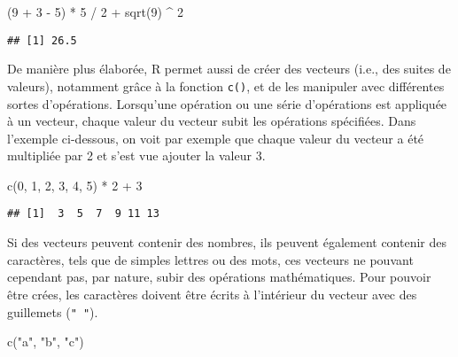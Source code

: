\documentclass[
]{book}
\newenvironment{Shaded}{\begin{snugshade}}{\end{snugshade}}
\newcommand{\DecValTok}[1]{\textcolor[rgb]{0.00,0.00,0.81}{#1}}
\newcommand{\FunctionTok}[1]{\textcolor[rgb]{0.00,0.00,0.00}{#1}}
\newcommand{\NormalTok}[1]{#1}
\newcommand{\SpecialCharTok}[1]{\textcolor[rgb]{0.00,0.00,0.00}{#1}}
\newcommand{\StringTok}[1]{\textcolor[rgb]{0.31,0.60,0.02}{#1}}
\begin{document}
\begin{Shaded}
\begin{Highlighting}[]
\NormalTok{(}\DecValTok{9} \SpecialCharTok{+} \DecValTok{3} \SpecialCharTok{{-}} \DecValTok{5}\NormalTok{) }\SpecialCharTok{*} \DecValTok{5} \SpecialCharTok{/} \DecValTok{2} \SpecialCharTok{+} \FunctionTok{sqrt}\NormalTok{(}\DecValTok{9}\NormalTok{) }\SpecialCharTok{\^{}} \DecValTok{2}
\end{Highlighting}
\end{Shaded}

\begin{verbatim}
## [1] 26.5
\end{verbatim}

De manière plus élaborée, R permet aussi de créer des vecteurs (i.e., des suites de valeurs), notamment grâce à la fonction \texttt{c()}, et de les manipuler avec différentes sortes d'opérations. Lorsqu'une opération ou une série d'opérations est appliquée à un vecteur, chaque valeur du vecteur subit les opérations spécifiées. Dans l'exemple ci-dessous, on voit par exemple que chaque valeur du vecteur a été multipliée par 2 et s'est vue ajouter la valeur 3.

\begin{Shaded}
\begin{Highlighting}[]
\FunctionTok{c}\NormalTok{(}\DecValTok{0}\NormalTok{, }\DecValTok{1}\NormalTok{, }\DecValTok{2}\NormalTok{, }\DecValTok{3}\NormalTok{, }\DecValTok{4}\NormalTok{, }\DecValTok{5}\NormalTok{) }\SpecialCharTok{*} \DecValTok{2} \SpecialCharTok{+} \DecValTok{3}
\end{Highlighting}
\end{Shaded}

\begin{verbatim}
## [1]  3  5  7  9 11 13
\end{verbatim}

Si des vecteurs peuvent contenir des nombres, ils peuvent également contenir des caractères, tels que de simples lettres ou des mots, ces vecteurs ne pouvant cependant pas, par nature, subir des opérations mathématiques. Pour pouvoir être crées, les caractères doivent être écrits à l'intérieur du vecteur avec des guillemets (\texttt{"\ "}).

\begin{Shaded}
\begin{Highlighting}[]
\FunctionTok{c}\NormalTok{(}\StringTok{"a"}\NormalTok{, }\StringTok{"b"}\NormalTok{, }\StringTok{"c"}\NormalTok{)}
\end{Highlighting}
\end{Shaded}
\end{document}
